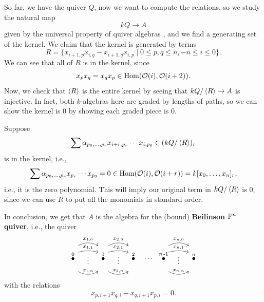 \documentclass[12pt]{article}
\begin{document}
\begin{eg}
    So far, we have the quiver $Q$, now we want to compute the relations, so we study the natural map
    \[kQ \to A\]
    given by the universal property of quiver algebras \cite[II.1.8]{quiver}, and we find a generating set of the kernel. We claim that the kernel is generated by terms
    \[R=\{x_{i+1,p}x_{i,q} - x_{i+1,q}x_{i,p} \mid 0\leq p,q \leq n, -n \leq i \leq 0\}.\]
    We can see that all of $R$ is in the kernel, since
    \[x_{p}x_{q} = x_{q}x_{p} \in \Hom(\cO(i),\cO(i+2)).\]
    Now, we check that $\<R\>$ is the entire kernel by seeing that $kQ/\<R\> \to A$ is injective. In fact, both $k$-algebras here are graded by lengths of paths, so we can show the kernel is 0 by showing each graded piece is 0.

    Suppose
    \[\sum \alpha_{p_0,\dots,p_r} x_{i+r,p_r} \cdots x_{i,p_0} \in (kQ/\<R\>)_r\]
    is in the kernel, i.e.,
    \[\sum \alpha_{p_0,\dots,p_r} x_{p_r} \cdots x_{p_0} = 0 \in \Hom(\cO(i),\cO(i+r)) = k[x_0,\dots,x_n]_r,\]
    i.e., it is the zero polynomial. This will imply our original term in $kQ/\<R\>$ is 0, since we can use $R$ to put all the monomials in standard order.

    In conclusion, we get that $A$ is the algebra for the (bound) \textbf{Beilinson $\P^n$ quiver}, i.e., the quiver
    \[\begin{tikzcd}[column sep=1cm]
        \overset{0}{\bullet} \rar[bend left=1cm, shift left=0.5cm,"x_{1,0}"] \rar[bend left=0.5cm, shift left=0.25cm,"x_{1,1}"] \rar[shift left=0cm, phantom, "\vdots"] \rar[bend left=-1cm, shift left=-0.5cm,"x_{1,n}"] & \overset{1}{\bullet} \rar[bend left=1cm, shift left=0.5cm,"x_{2,0}"] \rar[bend left=0.5cm, shift left=0.25cm,"x_{2,1}"] \rar[shift left=0cm, phantom, "\vdots"] \rar[bend left=-1cm, shift left=-0.5cm,"x_{2,n}"] & \overset{2}{\bullet} \rar[phantom,"\cdots"] & \bullet \ar[phantom, "n\,\text{-}1"{font=\scriptsize,above=2pt}] \rar[bend left=1cm, shift left=0.5cm,"x_{n,0}"] \rar[bend left=0.5cm, shift left=0.25cm,"x_{n,1}"] \rar[shift left=0cm, phantom, "\vdots"] \rar[bend left=-1cm, shift left=-0.5cm,"x_{n,n}"] & \overset{n}{\bullet}
    \end{tikzcd}\]
    with the relations
    \[x_{p,i+1}x_{q,i} - x_{q,i+1}x_{p,i} = 0.\]
\end{eg}


\nocite{*} %
\end{document}
